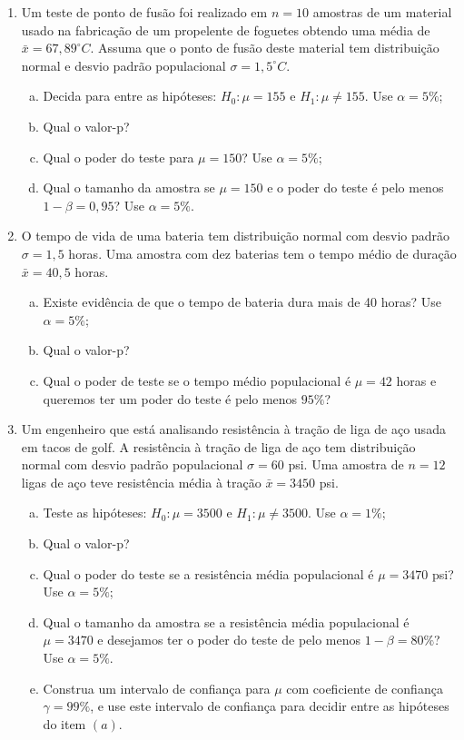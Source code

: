 \documentclass[12pt, a4paper]{article}
\begin{document}
\begin{enumerate}
	\item Um teste de ponto de fusão foi realizado em  $n=10$ amostras de um material usado na fabricação de um propelente de foguetes obtendo uma média de $\bar{x} = 67,89^\circ C$. Assuma que o ponto de fusão deste material tem distribuição normal e desvio padrão populacional $\sigma = 1,5^\circ C$.
	\begin{enumerate}[(a)]
		\item Decida para entre as hipóteses: $H_0: \mu = 155$ e $H_1: \mu \neq 155$. Use $\alpha = 5\%$;
		\item Qual o valor-p?
		\item Qual o poder do teste para $\mu=150$? Use $\alpha=5\%$;
		\item Qual o tamanho da amostra se $\mu=150$ e o poder do teste é pelo menos $1-\beta = 0,95$? Use $\alpha=5\%$.
	\end{enumerate}

	\item O tempo de vida de uma bateria tem distribuição normal com desvio padrão $\sigma=1,5$ horas. Uma amostra com dez baterias tem o tempo médio de duração $\bar{x} = 40,5$ horas. 
	\begin{enumerate}[(a)]
		\item Existe evidência de que o tempo de bateria dura mais de 40 horas? Use $\alpha=5\%$;
		\item Qual o valor-p?
		\item Qual o poder de teste se o tempo médio populacional é $\mu = 42$ horas e queremos ter um poder do teste é pelo menos $95\%$?
	\end{enumerate}

	\item Um engenheiro que está analisando resistência à tração de liga de aço usada em tacos de golf. A resistência à tração de liga de aço tem distribuição normal com desvio padrão populacional $\sigma = 60$ psi. Uma amostra de $n=12$ ligas de aço teve resistência média à tração $\bar{x} = 3450$ psi.
	\begin{enumerate}[(a)]
		\item Teste as hipóteses: $H_0: \mu = 3500$  e $H_1: \mu \neq 3500$. Use $\alpha = 1\%$;
		\item Qual o valor-p?
		\item Qual o poder do teste se a resistência média populacional é $\mu = 3470$ psi? Use $\alpha = 5\%$;
		\item Qual o tamanho da amostra se a resistência média populacional é $\mu = 3470$ e desejamos ter o poder do teste de pelo menos $1-\beta=80\%$? Use $\alpha=5\%$.
		\item Construa um intervalo de confiança para $\mu$ com coeficiente de confiança $\gamma=99\%$, e use este intervalo de confiança para decidir entre as hipóteses do item $(a)$.
	\end{enumerate}


\end{enumerate}
\end{document}

